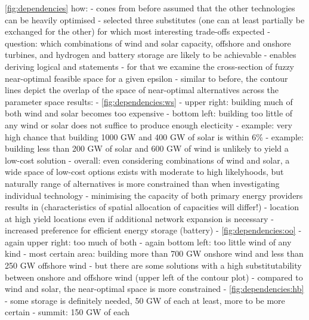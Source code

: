 \cref{fig:dependencies}
how:
- cones from before assumed that the other technologies can be heavily optimised
- selected three substitutes (one can at least partially be exchanged for the other) for which most interesting trade-offs expected
- question: which combinations of wind and solar capacity, offshore and onshore turbines, and hydrogen and battery storage are likely to be achievable
- enables deriving logical and statements
- for that we examine the cross-section of fuzzy near-optimal feasible space for a given epsilon
- similar to before, the contour lines depict the overlap of the space of near-optimal alternatives across the parameter space
results:
- \cref{fig:dependencies:ws}
  - upper right: building much of both wind and solar becomes too expensive
  - bottom left: building too little of any wind or solar does not suffice to produce enough electicity
  - example: very high chance that building 1000 GW and 400 GW of solar is within 6\%
  - example: building less than 200 GW of solar and 600 GW of wind is unlikely to yield a low-cost solution
  - overall: even considering combinations of wind and solar, a wide space of low-cost options exists with moderate to high likelyhoods, but naturally range of alternatives is more constrained than when investigating individual technology
  - minimising the capacity of both primary energy providers results in (characteristics of spatial allocation of capacities will differ!)
    - location at high yield locations even if additional network expansion is necessary
    - increased preference for efficient energy storage (battery)
- \cref{fig:dependencies:oo}
  - again upper right: too much of both
  - again bottom left: too little wind of any kind
  - most certain area: building more than 700 GW onshore wind and less than 250 GW offshore wind
  - but there are some solutions with a high substitutability between onshore and offshore wind (upper left of the contour plot)
  - compared to wind and solar, the near-optimal space is more constrained
- \cref{fig:dependencies:hb}
  - some storage is definitely needed, 50 GW of each at least, more to be more certain 
  - summit: 150 GW of each

